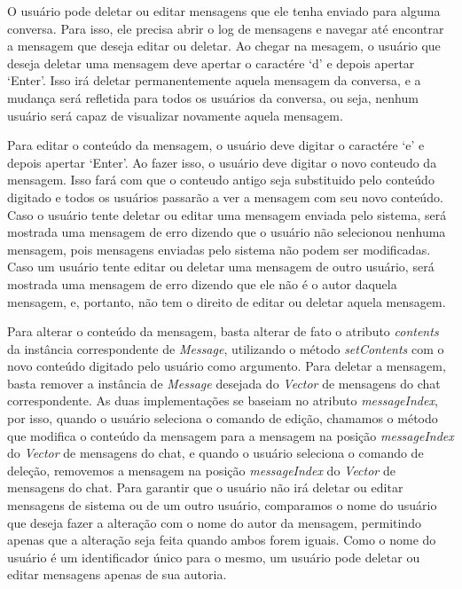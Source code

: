 \documentclass[../main.tex]{subfiles}
\begin{document}
O usuário pode deletar ou editar mensagens que ele tenha enviado para alguma conversa.
Para isso, ele precisa abrir o log de mensagens e navegar até encontrar a mensagem que deseja editar ou deletar.
Ao chegar na mesagem, o usuário que deseja deletar uma mensagem deve apertar o caractére `d' e depois apertar `Enter'.
Isso irá deletar permanentemente aquela mensagem da conversa, e a mudança será refletida para todos os usuários da conversa, ou seja, nenhum usuário será capaz de visualizar novamente aquela mensagem.

Para editar o conteúdo da mensagem, o usuário deve digitar o caractére `e' e depois apertar `Enter'.
Ao fazer isso, o usuário deve digitar o novo conteudo da mensagem.
Isso fará com que o conteudo antigo seja substituido pelo conteúdo digitado e todos os usuários passarão a ver a mensagem com seu novo conteúdo.
Caso o usuário tente deletar ou editar uma mensagem enviada pelo sistema, será mostrada uma mensagem de erro dizendo que o usuário não selecionou nenhuma mensagem, pois mensagens enviadas pelo sistema não podem ser modificadas.
Caso um usuário tente editar ou deletar uma mensagem de outro usuário, será mostrada uma mensagem de erro dizendo que ele não é o autor daquela mensagem, e, portanto, não tem o direito de editar ou deletar aquela mensagem.

Para alterar o conteúdo da mensagem, basta alterar de fato o atributo \textit{contents} da instância correspondente de \textit{Message}, utilizando o método \textit{setContents} com o novo conteúdo digitado pelo usuário como argumento.
Para deletar a mensagem, basta remover a instância de \textit{Message} desejada do \textit{Vector} de mensagens do chat correspondente.
As duas implementações se baseiam no atributo \textit{messageIndex}, por isso, quando o usuário seleciona o comando de edição, chamamos o método que modifica o conteúdo da mensagem para a mensagem na posição \textit{messageIndex} do \textit{Vector} de mensagens do chat, e quando o usuário seleciona o comando de deleção, removemos a mensagem na posição \textit{messageIndex} do \textit{Vector} de mensagens do chat.
Para garantir que o usuário não irá deletar ou editar mensagens de sistema ou de um outro usuário, comparamos o nome do usuário que deseja fazer a alteração com o nome do autor da mensagem, permitindo apenas que a alteração seja feita quando ambos forem iguais.
Como o nome do usuário é um identificador único para o mesmo, um usuário pode deletar ou editar mensagens apenas de sua autoria.
\end{document}
